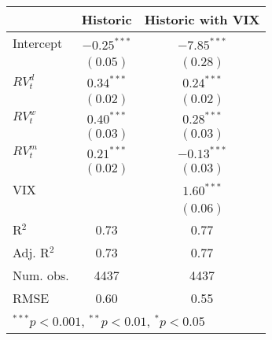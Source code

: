 
\begin{tabular}{l c c }
\hline
 & Historic & Historic with VIX \\
\hline
Intercept    & $-0.25^{***}$ & $-7.85^{***}$ \\
             & $(0.05)$      & $(0.28)$      \\
$RV_{t}^{d}$ & $0.34^{***}$  & $0.24^{***}$  \\
             & $(0.02)$      & $(0.02)$      \\
$RV_{t}^{w}$ & $0.40^{***}$  & $0.28^{***}$  \\
             & $(0.03)$      & $(0.03)$      \\
$RV_{t}^{m}$ & $0.21^{***}$  & $-0.13^{***}$ \\
             & $(0.02)$      & $(0.03)$      \\
VIX          &               & $1.60^{***}$  \\
             &               & $(0.06)$      \\
\hline
R$^2$        & 0.73          & 0.77          \\
Adj. R$^2$   & 0.73          & 0.77          \\
Num. obs.    & 4437          & 4437          \\
RMSE         & 0.60          & 0.55          \\
\hline
\multicolumn{3}{l}{\scriptsize{$^{***}p<0.001$, $^{**}p<0.01$, $^*p<0.05$}}
\end{tabular}
